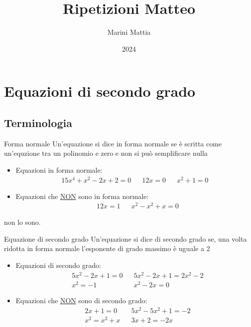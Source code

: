 \endofdump

\usetikzlibrary{external}
\usepackage{contour}
\tikzexternalize[prefix=tikz/]

\title{Ripetizioni Matteo}
\author{Marini Mattia}
\date{2024}


\maketitle
{}
\tableofcontents
\listofdefs

\newpage
\section{Equazioni di secondo grado}
\subsection{Terminologia}
\begin{definizione}{Forma normale}
	Un'equazione si dice in forma normale se è scritta come un'equzione tra un polinomio e zero e non si può semplificare nulla
\end{definizione}
\begin{itemize}
	\item Equazioni in forma normale:
	      \begin{align*}
		      15x^{4} + x^2  -2x + 2 = 0 &  & 12x = 0 &  & x^2 + 1 = 0
	      \end{align*}
	\item Equazioni che \underline{NON} sono in forma normale:
	      \begin{align*}
		       & 12x = 1 &  & x^2 - x^2  +x = 0
	      \end{align*}
\end{itemize}
non lo sono.

\begin{definizione}{Equazione di secondo grado}
	Un'equazione si dice di secondo grado se, una volta ridotta in forma normale l'esponente di grado massimo è uguale a 2
\end{definizione}
\begin{itemize}
	\item Equazioni di secondo grado:
	      \begin{align*}
		       & 5x^2 -2x + 1 = 0 &  & 5x^2 -2x + 1 = 2x^2  -2 \\
		       & x^2  = -1        &  & x^2 -2x = 0
	      \end{align*}
	\item Equazioni che \underline{NON} sono di secondo grado:
	      \begin{align*}
		       & 2x + 1 = 0     &  & 5x^2 -5x^2  + 1 =  -2 \\
		       & x^2  = x^2 + x &  & 3x + 2 = -2x
	      \end{align*}
\end{itemize}

